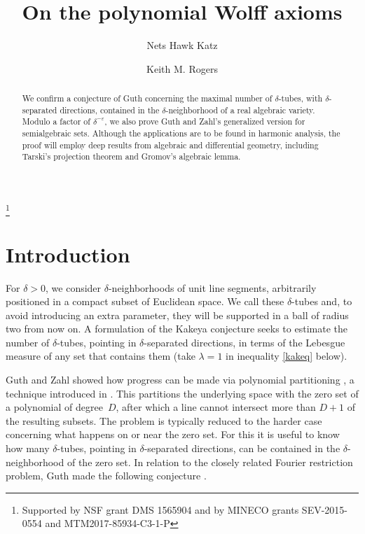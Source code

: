 \documentclass[letterpaper, reqno, 11pt]{amsart}
\theoremstyle{remark}
\numberwithin{equation}{section}
\begin{document}
 \title{On the polynomial Wolff axioms}
\author{Nets Hawk Katz}
\address{California Institute of Technology, Pasadena CA, U.S.A.}
\thanks{Supported by NSF grant DMS 1565904 and by MINECO grants SEV-2015-0554 and MTM2017-85934-C3-1-P}

\author{Keith M. Rogers}

\address{Instituto de Ciencias Matem\'aticas CSIC-UAM-UC3M-UCM, Madrid, Spain}


\begin{abstract}
We confirm a conjecture of Guth concerning the maximal number of $\delta$-tubes, with $\delta$-separated directions, contained in the $\delta$-neighborhood of a real algebraic variety. Modulo a factor of $\delta^{-\varepsilon}$,   we also prove  Guth and Zahl's generalized version for semialgebraic sets. Although the applications are to be found in harmonic analysis, the proof will employ deep results from algebraic and differential geometry, including Tarski's projection theorem and Gromov's algebraic lemma.
\end{abstract}

\maketitle


\section{Introduction}\label{introSection}



For $\delta>0$, we consider $\delta$-neighborhoods of unit line segments, arbitrarily positioned  in a compact subset of Euclidean space. We call these $\delta$-tubes and, to avoid introducing an extra parameter, they will be supported in a ball of radius two from now on. A formulation of the Kakeya conjecture seeks to estimate the number of $\delta$-tubes, pointing in $\delta$-separated directions, in terms of the Lebesgue measure of any set that contains them (take $\lambda=1$ in inequality \eqref{kakeq} below). 

Guth and Zahl showed how progress can be made via polynomial partitioning  \cite{GZ}, a technique introduced in \cite{GK}. This partitions the underlying space with the zero set of a polynomial of degree~$D$, after which a line cannot intersect more than $D+1$ of the resulting subsets. The problem is typically reduced to the harder case concerning what happens on or near the zero set. For this it is useful to know how many $\delta$-tubes, pointing in $\delta$-separated directions, can be contained in the $\delta$-neighborhood of the zero set. 
In relation to the closely related Fourier restriction problem, Guth made the following conjecture \cite[pp. 49]{G}.
\end{document}
